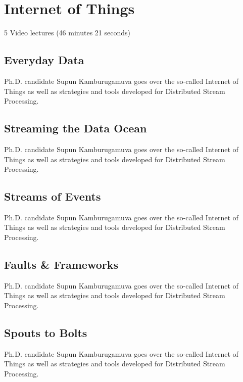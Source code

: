 \section{Internet of Things}

  5 Video lectures (46 minutes 21 seconds)

\subsection{Everyday Data}

Ph.D. candidate Supun Kamburugamuva goes over the so-called Internet of
Things as well as strategies and tools developed for Distributed Stream
Processing.


\subsection{Streaming the Data Ocean}

Ph.D. candidate Supun Kamburugamuva goes over the so-called Internet of
Things as well as strategies and tools developed for Distributed Stream
Processing.


\subsection{Streams of Events}

Ph.D. candidate Supun Kamburugamuva goes over the so-called Internet of
Things as well as strategies and tools developed for Distributed Stream
Processing.


\subsection{Faults \& Frameworks}

Ph.D. candidate Supun Kamburugamuva goes over the so-called Internet of
Things as well as strategies and tools developed for Distributed Stream
Processing.


\subsection{Spouts to Bolts}

Ph.D. candidate Supun Kamburugamuva goes over the so-called Internet of
Things as well as strategies and tools developed for Distributed Stream
Processing.


